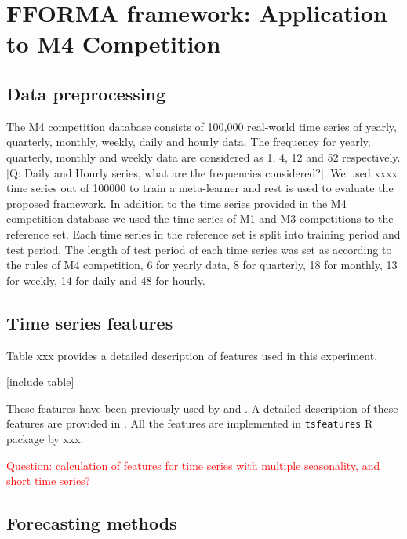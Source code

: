 \documentclass[11pt,a4paper,]{article}
\theoremstyle{definition}
\theoremstyle{definition}
\theoremstyle{definition}
\theoremstyle{remark}
\begin{document}
\section{FFORMA framework: Application to M4
Competition}\label{fforma-framework-application-to-m4-competition}

\subsection{Data preprocessing}\label{data-preprocessing}

The M4 competition database consists of 100,000 real-world time series
of yearly, quarterly, monthly, weekly, daily and hourly data. The
frequency for yearly, quarterly, monthly and weekly data are considered
as 1, 4, 12 and 52 respectively. {[}Q: Daily and Hourly series, what are
the frequencies considered?{]}. We used xxxx time series out of 100000
to train a meta-learner and rest is used to evaluate the proposed
framework. In addition to the time series provided in the M4 competition
database we used the time series of M1 and M3 competitions
\autocite{makridakis2000m3} to the reference set. Each time series in
the reference set is split into training period and test period. The
length of test period of each time series was set as according to the
rules of M4 competition, 6 for yearly data, 8 for quarterly, 18 for
monthly, 13 for weekly, 14 for daily and 48 for hourly.

\subsection{Time series features}\label{time-series-features}

Table xxx provides a detailed description of features used in this
experiment.

{[}include table{]}

These features have been previously used by \textcite{fforms} and
\textcite{hyndman2015large}. A detailed description of these features
are provided in \textcite{fforms}. All the features are implemented in
\texttt{tsfeatures} R package by xxx.

\textcolor{red}{Question: calculation of features for time series with multiple seasonality, and short time series?}

\subsection{Forecasting methods}\label{forecasting-methods}
\end{document}

